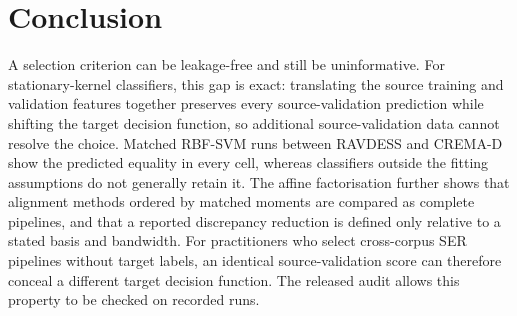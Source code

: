 \section{Conclusion}
\label{sec:conclusion}

A selection criterion can be leakage-free and still be uninformative. For
stationary-kernel classifiers, this gap is exact: translating the source
training and validation features together preserves every source-validation
prediction while shifting the target decision function, so additional
source-validation data cannot resolve the choice. Matched RBF-SVM runs between
RAVDESS and CREMA-D show the predicted equality in every cell, whereas
classifiers outside the fitting assumptions do not generally retain it. The
affine factorisation further shows that alignment methods ordered by matched
moments are compared as complete pipelines, and that a reported discrepancy
reduction is defined only relative to a stated basis and bandwidth. For
practitioners who select cross-corpus SER pipelines without target labels, an
identical source-validation score can therefore conceal a different target
decision function. The released audit allows this property to be checked on
recorded runs.
